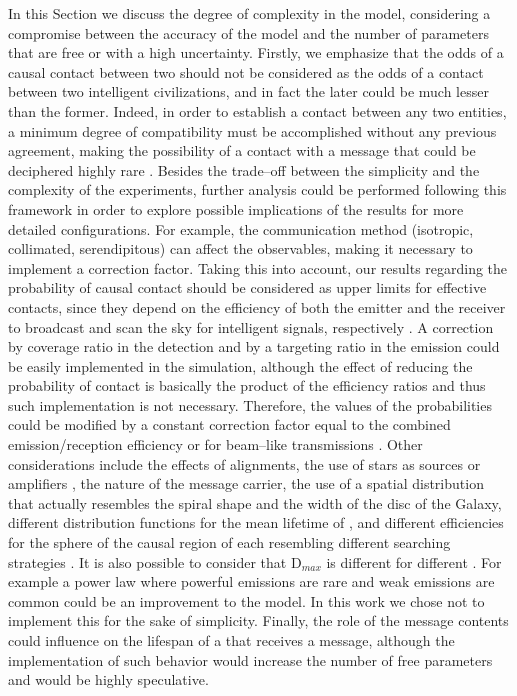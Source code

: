 In this Section we discuss the degree of complexity in the model,
considering a compromise between the accuracy of the model and the
number of parameters that are free or with a high uncertainty.
%
Firstly, we emphasize that the odds of a causal contact between two
\cetis{} should not be considered as the odds of a contact between two
intelligent civilizations, and in fact the later could be much lesser
than the former.
%
Indeed, in order to establish a contact between any two entities, a
minimum degree of compatibility must be accomplished without any
previous agreement, making the possibility of a contact with a message
that could be deciphered highly rare \citep[see e.g. ][]{forgan_collimated_2014}.
%
Besides the trade--off between the simplicity and the complexity of
the experiments, further analysis could be performed following this
framework in order to explore possible implications of the results for
more detailed configurations.
%
For example, the communication method (isotropic, collimated,
serendipitous) can affect the observables, making it necessary to
implement a correction factor.
%
Taking this into account, our results regarding the probability of
causal contact should be considered as upper limits for effective
contacts, since they depend on the efficiency of both the emitter and
the receiver to broadcast and scan the sky for intelligent signals,
respectively \citep{grimaldi_signal_2017}.
%
A correction by coverage ratio in the detection and by a targeting
ratio in the emission could be easily implemented in the simulation,
although the effect of reducing the probability of contact is
basically the product of the efficiency ratios and thus such
implementation is not necessary.
%
Therefore, the values of the probabilities could be modified by a
constant correction factor equal to the combined emission/reception
efficiency \citep{smith_broadcasting_2009, anchordoqui_upper_2019,
forgan_collimated_2014} or for beam--like transmissions
\citep{grimaldi_signal_2017}.
%
Other considerations include the effects of alignments, the use of
stars as sources or amplifiers \citep{Edmondson2003, borra_searching_2012}, 
the nature of the message carrier, the
use of a spatial distribution that actually resembles the spiral shape
and the width of the disc of the Galaxy, different distribution
functions for the mean lifetime of \cetis{}, and different
efficiencies for the sphere of the causal region of each \ceti{}
resembling different searching strategies
\citep{hippke_interstellar_2017}.
%
It is also possible to consider that D$_{max}$ is different for
different \cetis{}.  For example a power law where powerful emissions
are rare and weak emissions are common could be an improvement to the
model.
%
In this work we chose not to implement this for the sake of
simplicity.
%
Finally, the role of the message contents could influence on the
lifespan of a \ceti{} that receives a message, although the
implementation of such behavior would increase the number of free
parameters and would be highly speculative.

